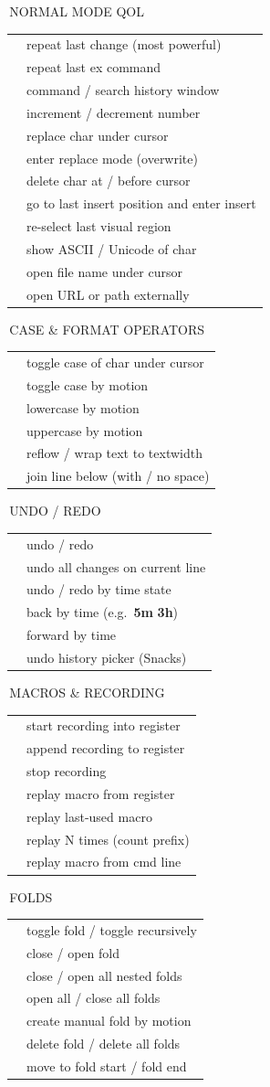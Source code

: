 \documentclass[9pt,a4paper,landscape]{extarticle}
\makeatletter
\newcommand{\kbd}[1]{{\ttfamily\bfseries\footnotesize\color{keyclr}#1}}
\newcommand{\sect}[1]{%
  \vspace{0.5pt}%
  {\setlength{\fboxsep}{1pt}%
   \noindent\colorbox{hdrbg}{\parbox{\dimexpr\columnwidth-2pt\relax}{%
     \color{hdrfg}\bfseries\sffamily\small\strut\,#1}}}%
  \par\vspace{0pt}}
\newlength{\kdsep}\setlength{\kdsep}{0pt}
\newcommand{\kd}[2]{\kbd{#1} & #2 \\[\kdsep]}
\newenvironment{kt}{%
  \setlength{\tabcolsep}{0pt}%
  \begin{tabular}{@{}>{\footnotesize\raggedright\arraybackslash}p{17mm}@{\hspace{2pt}}>{\footnotesize\color{bodyclr}\raggedright\arraybackslash}p{\dimexpr\columnwidth-17mm-2pt\relax}@{}}%
}{%
  \end{tabular}\par}
\makeatother
\begin{document}
\begin{multicols}{5}
\sect{NORMAL MODE QOL}
\begin{kt}
\kd{.}{repeat last change (most powerful)}
\kd{@:}{repeat last ex command}
\kd{q:\,/\,q/}{command / search history window}
\kd{C-a\,/\,C-x}{increment / decrement number}
\kd{r\{c\}}{replace char under cursor}
\kd{R}{enter replace mode (overwrite)}
\kd{x\,/\,X}{delete char at / before cursor}
\kd{gi}{go to last insert position and enter insert}
\kd{gv}{re-select last visual region}
\kd{ga}{show ASCII / Unicode of char}
\kd{gf}{open file name under cursor}
\kd{gx}{open URL or path externally}
\end{kt}

\sect{CASE \& FORMAT OPERATORS}
\begin{kt}
\kd{\textasciitilde}{toggle case of char under cursor}
\kd{g\textasciitilde\,\{m\}}{toggle case by motion}
\kd{gu\,\{m\}}{lowercase by motion}
\kd{gU\,\{m\}}{uppercase by motion}
\kd{gq\,\{m\}}{reflow / wrap text to textwidth}
\kd{J\,/\,gJ}{join line below (with / no space)}
\end{kt}

\sect{UNDO / REDO\enspace{\scriptsize undofile = true (persistent)}}
\begin{kt}
\kd{u\,/\,C-r}{undo / redo}
\kd{U}{undo all changes on current line}
\kd{g-\,/\,g+}{undo / redo by time state}
\kd{:earlier\,\{t\}}{back by time (e.g.\ \kbd{5m} \kbd{3h})}
\kd{:later\,\{t\}}{forward by time}
\kd{SPC\,su}{undo history picker (Snacks)}
\end{kt}

\sect{MACROS \& RECORDING}
\begin{kt}
\kd{q\{a-z\}}{start recording into register}
\kd{q\{A-Z\}}{append recording to register}
\kd{q}{stop recording}
\kd{@\{a-z\}}{replay macro from register}
\kd{@@}{replay last-used macro}
\kd{N@\{a-z\}}{replay N times (count prefix)}
\kd{:\@\{a-z\}}{replay macro from cmd line}
\end{kt}

\sect{FOLDS}
\begin{kt}
\kd{za\,/\,zA}{toggle fold / toggle recursively}
\kd{zc\,/\,zo}{close / open fold}
\kd{zC\,/\,zO}{close / open all nested folds}
\kd{zR\,/\,zM}{open all / close all folds}
\kd{zf\{m\}}{create manual fold by motion}
\kd{zd\,/\,zD}{delete fold / delete all folds}
\kd{{[}z\,/\,{]}z}{move to fold start / fold end}
\end{kt}


\end{multicols}
\end{document}
